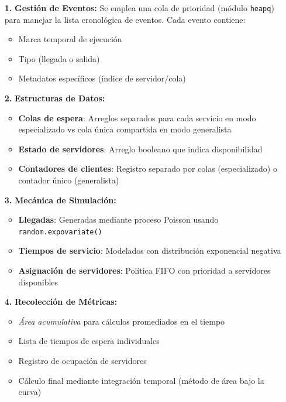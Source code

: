 \documentclass[letterpaper, 12pt]{report}
\begin{document}
\begin{itemize}
    \item[\textbf{1.}] \textbf{Gestión de Eventos:}
    Se emplea una cola de prioridad (módulo \texttt{heapq}) para manejar la lista cronológica de eventos. Cada evento contiene:
    \begin{itemize}
        \item Marca temporal de ejecución
        \item Tipo (llegada o salida)
        \item Metadatos específicos (índice de servidor/cola)
    \end{itemize}
    
    \item[\textbf{2.}] \textbf{Estructuras de Datos:}
    \begin{itemize}
        \item \textbf{Colas de espera}: Arreglos separados para cada servicio en modo especializado vs cola única compartida en modo generalista
        \item \textbf{Estado de servidores}: Arreglo booleano que indica disponibilidad
        \item \textbf{Contadores de clientes}: Registro separado por colas (especializado) o contador único (generalista)
    \end{itemize}
    
    \item[\textbf{3.}] \textbf{Mecánica de Simulación:}
    \begin{itemize}
        \item \textbf{Llegadas}: Generadas mediante proceso Poisson usando \texttt{random.expovariate()}
        \item \textbf{Tiempos de servicio}: Modelados con distribución exponencial negativa
        \item \textbf{Asignación de servidores}: Política FIFO con prioridad a servidores disponibles
    \end{itemize}
    
    \item[\textbf{4.}] \textbf{Recolección de Métricas:}
    \begin{itemize}
        \item \textit{Área acumulativa} para cálculos promediados en el tiempo
        \item Lista de tiempos de espera individuales
        \item Registro de ocupación de servidores
        \item Cálculo final mediante integración temporal (método de área bajo la curva)
    \end{itemize}
\end{itemize}
\end{document}
